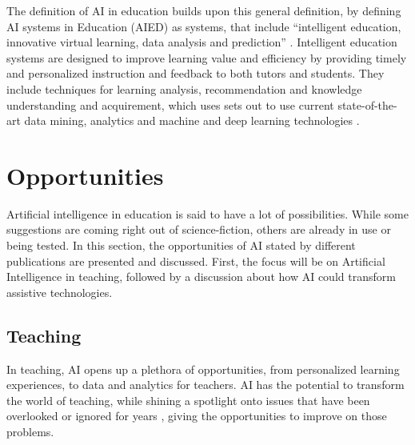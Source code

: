 \documentclass{Academic}
\begin{document}
    The definition of AI in education builds upon this general definition, by defining AI systems in Education (AIED) as systems, that include \enquote{intelligent education, innovative virtual learning, data analysis and prediction} \cite{chen_artificial_2020}. Intelligent education systems are designed to improve learning value and efficiency by providing timely and personalized instruction and feedback to both tutors and students. They include techniques for learning analysis, recommendation and knowledge understanding and acquirement, which uses sets out to use current state-of-the-art data mining, analytics and machine and deep learning technologies \cite{chen_artificial_2020}.

    \section{Opportunities}
    Artificial intelligence in education is said to have a lot of possibilities. While some suggestions are coming right out of science-fiction, others are already in use or being tested. In this section, the opportunities  of AI stated by different publications are presented and discussed. First, the focus will be on Artificial Intelligence in teaching, followed by a discussion about how AI could transform assistive technologies.

    \subsection{Teaching}
    In teaching, AI opens up a plethora of opportunities, from personalized learning experiences, to data and analytics for teachers. AI has the potential to transform the world of teaching, while shining a spotlight onto issues that have been overlooked or ignored for years \cite{holmes_artificial_2023}, giving the opportunities to improve on those problems.
\end{document}
